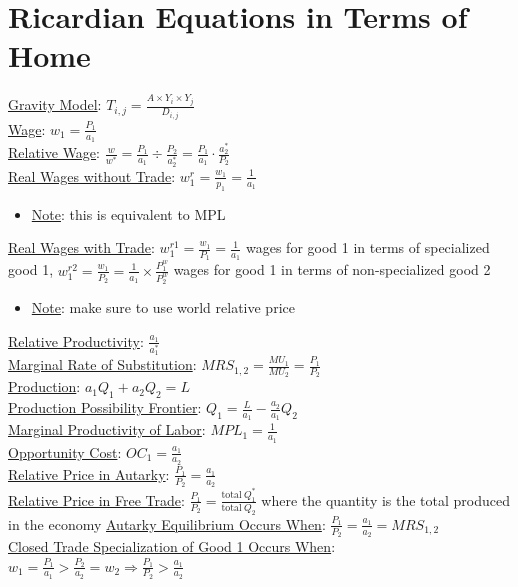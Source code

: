 \documentclass{article}
\begin{document}
\section{Ricardian Equations in Terms of Home}
\underline{Gravity Model}: $T_{i,j} = \frac{A \times Y_{i} \times Y_{j}}{D_{i,j}}$ \\
\underline{Wage}: $w_{1} = \frac{P_{1}}{a_{1}}$ \\
\underline{Relative Wage}: $\frac{w}{w^{*}} = \frac{P_{1}}{a_{1}} \div \frac{P_{2}}{a_{2}^{*}} = \frac{P_{1}}{a_{1}} \cdot  \frac{a_{2}^{*}}{P_{2}}$ \\
\underline{Real Wages without Trade}: $w_{1}^{r} = \frac{w_{1}}{p_{1}} = \frac{1}{a_{1}}$
\begin{itemize}
  \item  \underline{Note}: this is equivalent to MPL
\end{itemize}
\underline{Real Wages with Trade}: $w_{1}^{r1} = \frac{w_{1}}{P_{1}} = \frac{1}{a_{1}}$ wages for good 1 in terms of specialized good 1, $w_{1}^{r2} = \frac{w_{1}}{P_{2}} = \frac{1}{a_{1}} \times \frac{P_{1}^{w}}{P_{2}^{w}}$ wages for good 1 in terms of non-specialized good 2 \\
\begin{itemize}
  \item  \underline{Note}: make sure to use world relative price
\end{itemize}
\underline{Relative Productivity}: $\frac{a_{1}}{a_{1}^{*}}$ \\
\underline{Marginal Rate of Substitution}: $MRS_{1,2} = \frac{MU_{1}}{MU_{2}} = \frac{P_{1}}{P_{2}}$ \\
\underline{Production}: $a_{1}Q_{1} + a_{2}Q_{2} = L$ \\
\underline{Production Possibility Frontier}: $Q_{1} = \frac{L}{a_{1}} - \frac{a_{2}}{a_{1}}Q_{2}$ \\
\underline{Marginal Productivity of Labor}: $MPL_{1} = \frac{1}{a_{1}}$ \\
\underline{Opportunity Cost}: $OC_{1} = \frac{a_{1}}{a_{2}}$ \\
\underline{Relative Price in Autarky}: $\frac{P_{1}}{P_{2}} = \frac{a_{1}}{a_{2}}$ \\
\underline{Relative Price in Free Trade}: $\frac{P_{1}}{P_{2}} = \frac{\text{total} \ Q_{1}^{*}}{\text{total} \ Q_{2}}$ where the quantity is the total produced in the economy
\underline{Autarky Equilibrium Occurs When}: $\frac{P_{1}}{P_{2}} = \frac{a_{1}}{a_{2}} = MRS_{1,2}$ \\
\underline{Closed Trade Specialization of Good 1 Occurs When}: $w_{1} = \frac{P_{1}}{a_{1}} > \frac{P_{2}}{a_{2}} = w_{2} \Rightarrow \frac{P_{1}}{P_{2}} > \frac{a_{1}}{a_{2}}$ \\
\end{document}
